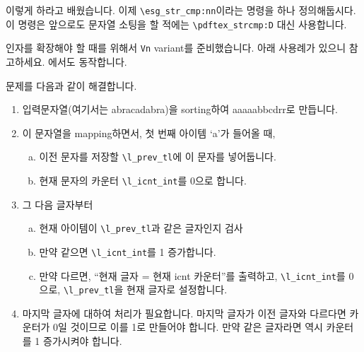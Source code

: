 \documentclass[a4paper,amsmath]{oblivoir}
\begin{document}
이렇게 하라고 배웠습니다. 이제 \verb|\esg_str_cmp:nn|이라는 명령을 하나 정의해둡시다. 이 명령은 앞으로도 문자열 소팅을 할 적에는 \verb|\pdftex_strcmp:D| 대신 사용합니다.


인자를 확장해야 할 때를 위해서 \verb|Vn| variant를 준비했습니다. 아래 사용례가 있으니 참고하세요. 에서도 동작합니다.

\bigskip

문제를 다음과 같이 해결합니다. 
\begin{enumerate}[(1)] \firmlist
\item 입력문자열(여기서는 abracadabra)을 sorting하여 aaaaabbcdrr로 만듭니다.

\item 이 문자열을 mapping하면서, 첫 번째 아이템 ‘a’가 들어올 때,
\begin{enumerate}[(a)] \firmlist
\item 이전 문자를 저장할 \verb|\l_prev_tl|에 이 문자를 넣어둡니다.
\item 현재 문자의 카운터 \verb|\l_icnt_int|를 0으로 합니다.
\end{enumerate}

\item 그 다음 글자부터
\begin{enumerate}[(a)] \firmlist
\item 현재 아이템이 \verb|\l_prev_tl|과 같은 글자인지 검사
\item 만약 같으면 \verb|\l_icnt_int|를 1 증가합니다.
\item 만약 다르면, “현재 글자 = 현재 icnt 카운터”를 출력하고, \verb|\l_icnt_int|를 0으로, \verb|\l_prev_tl|을 현재 글자로 설정합니다.
\end{enumerate}

\item 마지막 글자에 대하여 처리가 필요합니다. 마지막 글자가 이전 글자와 다르다면 카운터가 0일 것이므로 이를 1로 만들어야 합니다. 만약 같은 글자라면 역시 카운터를 1 증가시켜야 합니다.
\end{enumerate}
\end{document}
